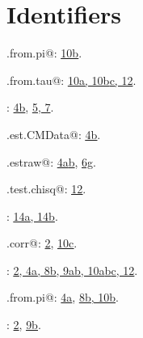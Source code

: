 \documentclass[reqno]{amsart}
\renewcommand{\NWlink}[2]{\hyperlink{#1}{#2}}
\begin{document}
\section{Identifiers}


{\small\begin{list}{}{\setlength{\itemsep}{-\parsep}\setlength{\itemindent}{-\leftmargin}}
\item \verb@corr.from.pi@: \underline{\NWlink{nuweb10b}{10b}}.
\item \verb@corr.from.tau@: \underline{\NWlink{nuweb10a}{10a}}\NWlink{nuweb10b}{, 10b}\NWlink{nuweb10c}{c}\NWlink{nuweb12}{, 12}.
\item \verb@Marginals@: \NWlink{nuweb4b}{4b}, \underline{\NWlink{nuweb5}{5}}\NWlink{nuweb7}{, 7}.
\item \verb@mc.est.CMData@: \underline{\NWlink{nuweb4b}{4b}}.
\item \verb@mc.estraw@: \NWlink{nuweb4a}{4a}\NWlink{nuweb4b}{b}, \underline{\NWlink{nuweb6g}{6g}}.
\item \verb@mc.test.chisq@: \underline{\NWlink{nuweb12}{12}}.
\item \verb@mChoose@: \underline{\NWlink{nuweb14a}{14a}}\NWlink{nuweb14b}{, 14b}.
\item \verb@multi.corr@: \NWlink{nuweb2}{2}, \underline{\NWlink{nuweb10c}{10c}}.
\item \verb@tau@: \underline{\NWlink{nuweb2}{2}}\NWlink{nuweb4a}{, 4a}\NWlink{nuweb8b}{, 8b}\NWlink{nuweb9a}{, 9a}\NWlink{nuweb9b}{b}\NWlink{nuweb10a}{, 10a}\NWlink{nuweb10b}{b}\NWlink{nuweb10c}{c}\NWlink{nuweb12}{, 12}.
\item \verb@tau.from.pi@: \NWlink{nuweb4a}{4a}, \underline{\NWlink{nuweb8b}{8b}}\NWlink{nuweb10b}{, 10b}.
\item \verb@uniprobs@: \NWlink{nuweb2}{2}, \underline{\NWlink{nuweb9b}{9b}}.
\end{list}}
\end{document}
